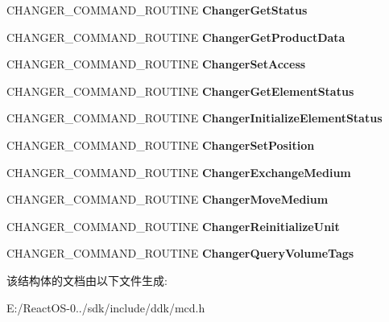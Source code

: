 \begin{DoxyCompactItemize}
C\+H\+A\+N\+G\+E\+R\+\_\+\+C\+O\+M\+M\+A\+N\+D\+\_\+\+R\+O\+U\+T\+I\+NE {\bfseries Changer\+Get\+Status}
\item 
\mbox{\label{struct___m_c_d___i_n_i_t___d_a_t_a_a25bf177851c836257b6e2e0889a28f16}} 
C\+H\+A\+N\+G\+E\+R\+\_\+\+C\+O\+M\+M\+A\+N\+D\+\_\+\+R\+O\+U\+T\+I\+NE {\bfseries Changer\+Get\+Product\+Data}
\item 
\mbox{\label{struct___m_c_d___i_n_i_t___d_a_t_a_ab99a197d404bca69d9a09ca747c56ba7}} 
C\+H\+A\+N\+G\+E\+R\+\_\+\+C\+O\+M\+M\+A\+N\+D\+\_\+\+R\+O\+U\+T\+I\+NE {\bfseries Changer\+Set\+Access}
\item 
\mbox{\label{struct___m_c_d___i_n_i_t___d_a_t_a_a26f3cefbf1249d26b1280509de0dfe63}} 
C\+H\+A\+N\+G\+E\+R\+\_\+\+C\+O\+M\+M\+A\+N\+D\+\_\+\+R\+O\+U\+T\+I\+NE {\bfseries Changer\+Get\+Element\+Status}
\item 
\mbox{\label{struct___m_c_d___i_n_i_t___d_a_t_a_a39265a201a5bc2768b0cde60d10fa779}} 
C\+H\+A\+N\+G\+E\+R\+\_\+\+C\+O\+M\+M\+A\+N\+D\+\_\+\+R\+O\+U\+T\+I\+NE {\bfseries Changer\+Initialize\+Element\+Status}
\item 
\mbox{\label{struct___m_c_d___i_n_i_t___d_a_t_a_a88e19a707ef14f243379d031d3e0c1b0}} 
C\+H\+A\+N\+G\+E\+R\+\_\+\+C\+O\+M\+M\+A\+N\+D\+\_\+\+R\+O\+U\+T\+I\+NE {\bfseries Changer\+Set\+Position}
\item 
\mbox{\label{struct___m_c_d___i_n_i_t___d_a_t_a_a0c0aebb59cb53ede369df6222374fd49}} 
C\+H\+A\+N\+G\+E\+R\+\_\+\+C\+O\+M\+M\+A\+N\+D\+\_\+\+R\+O\+U\+T\+I\+NE {\bfseries Changer\+Exchange\+Medium}
\item 
\mbox{\label{struct___m_c_d___i_n_i_t___d_a_t_a_a515d7d4f5493aa2795fdb81d9d7cbd07}} 
C\+H\+A\+N\+G\+E\+R\+\_\+\+C\+O\+M\+M\+A\+N\+D\+\_\+\+R\+O\+U\+T\+I\+NE {\bfseries Changer\+Move\+Medium}
\item 
\mbox{\label{struct___m_c_d___i_n_i_t___d_a_t_a_a096b60dbe823532adfab036745aeb49b}} 
C\+H\+A\+N\+G\+E\+R\+\_\+\+C\+O\+M\+M\+A\+N\+D\+\_\+\+R\+O\+U\+T\+I\+NE {\bfseries Changer\+Reinitialize\+Unit}
\item 
\mbox{\label{struct___m_c_d___i_n_i_t___d_a_t_a_ab2feb2e62da1106bd811d9a1ea0c4618}} 
C\+H\+A\+N\+G\+E\+R\+\_\+\+C\+O\+M\+M\+A\+N\+D\+\_\+\+R\+O\+U\+T\+I\+NE {\bfseries Changer\+Query\+Volume\+Tags}
\end{DoxyCompactItemize}


该结构体的文档由以下文件生成\+:\begin{DoxyCompactItemize}
\item 
E\+:/\+React\+O\+S-\/0../sdk/include/ddk/mcd.\+h\end{DoxyCompactItemize}
